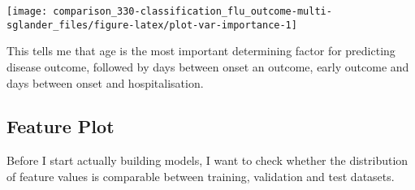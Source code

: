 \documentclass[]{book}
\begin{document}
\begin{center}\texttt{[image: comparison\_330-classification\_flu\_outcome-multi-sglander\_files/figure-latex/plot-var-importance-1]} \end{center}

This tells me that age is the most important determining factor for predicting disease outcome, followed by days between onset an outcome, early outcome and days between onset and hospitalisation.

\hypertarget{feature-plot}{%
\subsection{Feature Plot}\label{feature-plot}}

Before I start actually building models, I want to check whether the distribution of feature values is comparable between training, validation and test datasets.
\end{document}
